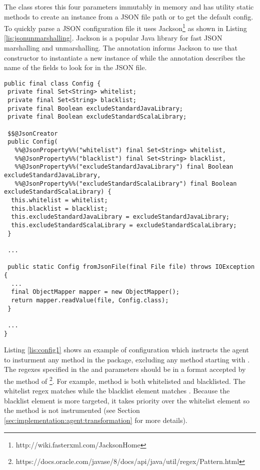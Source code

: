\noindent The  class stores this four parameters immutably in memory and has utility static methods to create an instance from a JSON file path or to get the default config. To quickly parse a JSON configuration file it uses Jackson\footnote{http://wiki.fasterxml.com/JacksonHome} as shown in Listing \ref{lis:jsonunmarshalling}. Jackson is a popular Java library for fast JSON marshalling and unmarshalling. The  annotation informs Jackson to use that constructor to instantiate a new instance of  while the  annotation describes the name of the fields to look for in the JSON file.

\begin{lstlisting}[breaklines,caption={JSON unmarshalling in $Config$},label=lis:jsonunmarshalling]
public final class Config {
 private final Set<String> whitelist;
 private final Set<String> blacklist;
 private final Boolean excludeStandardJavaLibrary;
 private final Boolean excludeStandardScalaLibrary;

 $$@JsonCreator
 public Config(
   %%@JsonProperty%%("whitelist") final Set<String> whitelist,
   %%@JsonProperty%%("blacklist") final Set<String> blacklist,
   %%@JsonProperty%%("excludeStandardJavaLibrary") final Boolean excludeStandardJavaLibrary,
   %%@JsonProperty%%("excludeStandardScalaLibrary") final Boolean excludeStandardScalaLibrary) {
  this.whitelist = whitelist;
  this.blacklist = blacklist;
  this.excludeStandardJavaLibrary = excludeStandardJavaLibrary;
  this.excludeStandardScalaLibrary = excludeStandardScalaLibrary;
 }

 ...

 public static Config fromJsonFile(final File file) throws IOException {
  ...
  final ObjectMapper mapper = new ObjectMapper();
  return mapper.readValue(file, Config.class);
 }

 ...
}
\end{lstlisting}

\noindent Listing \ref{lis:config1} shows an example of configuration which instructs the agent to insturment any method in the  package, excluding any method starting with . The regexes specified in the  and  parameters should be in a format accepted by the  method of \footnote{https://docs.oracle.com/javase/8/docs/api/java/util/regex/Pattern.html}. For example, method  is both whitelisted and blacklisted. The whitelist regex matches  while the blacklist element matches . Because the blacklist element is more targeted, it takes priority over the whitelist element so the method is not instrumented (see Section \ref{sec:implementation:agent:transformation} for more details).


